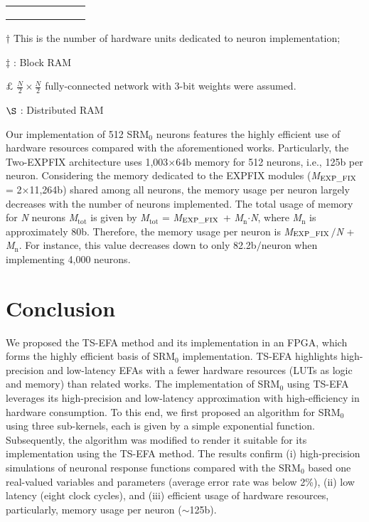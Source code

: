 \documentclass[10pt,journal]{IEEEtran}
\begin{document}
\begin{table*}[t]
\begin{threeparttable}
\begin{tabular}[ht]{lcccccc}
    &&&&&&\\ &&&&&&\\ &&&&&&\\
\bottomrule \bottomrule
\end{tabular}
\begin{tablenotes}\small
\item[$\dagger$] This is the number of hardware units dedicated to neuron implementation;
\item[$\ddagger$]: Block RAM
\item[$\pounds$] $\frac{N}{2}\times\frac{N}{2}$ fully-connected network with 3-bit weights were assumed.
\item[$\S$]: Distributed RAM
\end{tablenotes}
\end{threeparttable}
\end{table*}

Our implementation of 512 SRM$_\textrm{0}$ neurons features the highly efficient use of hardware resources compared with the aforementioned works. 
Particularly, the Two-EXP\textunderscore FIX architecture uses 1,003$\times$64b memory for 512 neurons, i.e., 125b per neuron. 
Considering the memory dedicated to the EXP\textunderscore FIX modules (\textit{M}$_\textrm{EXP\textunderscore FIX}$ = 2$\times$11,264b) shared among all neurons, the memory usage per neuron largely decreases with the number of neurons implemented. 
The total usage of memory for \textit{N} neurons \textit{M}$_\textrm{tot}$ is given by \textit{M}$_\textrm{tot}$ = \textit{M}$_\textrm{EXP\textunderscore FIX}$ + \textit{M}$_\textrm{n}$$\cdot$\textit{N}, where \textit{M}$_\textrm{n}$ is approximately 80b.  
Therefore, the memory usage per neuron is \textit{M}$_\textrm{EXP\textunderscore FIX}$$\mathbin{/}$\textit{N} + \textit{M}$_\textrm{n}$. 
For instance, this value decreases down to only 82.2b$\mathbin{/}$neuron when implementing 4,000 neurons. 



\section{Conclusion}\label{sec:con}
We proposed the TS-EFA method and its implementation in an FPGA, which forms the highly efficient basis of SRM$_\textrm{0}$ implementation. 
TS-EFA highlights high-precision and low-latency EFAs with a fewer hardware resources (LUTs as logic and memory) than related works.
The implementation of SRM$_\textrm{0}$ using TS-EFA leverages its high-precision and low-latency approximation with high-efficiency in hardware consumption. 
To this end, we first proposed an algorithm for SRM$_\textrm{0}$ using three sub-kernels, each is given by a simple exponential function. 
Subsequently, the algorithm was modified to render it suitable for its implementation using the TS-EFA method. 
The results confirm (i) high-precision simulations of neuronal response functions compared with the SRM$_\textrm{0}$ based one real-valued variables and parameters (average error rate was below 2\%), (ii) low latency (eight clock cycles), and (iii) efficient usage of hardware resources, particularly, memory usage per neuron ($\sim$125b).      
\end{document}
